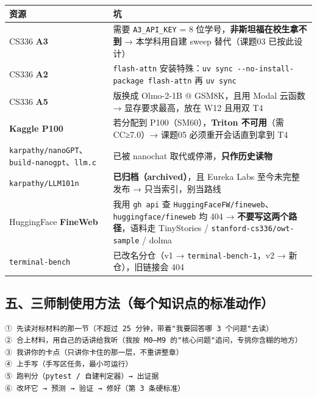 \documentclass[
  chinese,
  11pt,
]{ctexart}
\newcounter{none} %
\begin{document}
{\def\LTcaptype{none} %
\begin{longtable}[]{@{}
  >{\raggedright\arraybackslash}p{}
  >{\raggedright\arraybackslash}p{}@{}}
\toprule\noalign{}
\begin{minipage}[b]{\linewidth}\raggedright
资源
\end{minipage} & \begin{minipage}[b]{\linewidth}\raggedright
坑
\end{minipage} \\
\midrule\noalign{}
\endhead
\bottomrule\noalign{}
\endlastfoot
CS336 \textbf{A3} & 需要 \texttt{A3\_API\_KEY} = 8 位学号，\textbf{非斯坦福在校生拿不到} → 本学科用自建 sweep 替代（课题03 已按此设计） \\
CS336 \textbf{A2} & \texttt{flash-attn} 安装特殊：\texttt{uv\ sync\ -\/-no-install-package\ flash-attn} 再 \texttt{uv\ sync} \\
CS336 \textbf{A5} & 2026 版换成 Olmo-2-1B @ GSM8K，且用 Modal 云函数 → 显存要求最高，放在 W12 且用双 T4 \\
\textbf{Kaggle P100} & 若分配到 P100（SM60），\textbf{Triton 不可用}（需 CC≥7.0）→ 课题05 必须重开会话直到拿到 T4 \\
\texttt{karpathy/nanoGPT}、\texttt{build-nanogpt}、\texttt{llm.c} & 已被 nanochat 取代或停滞，\textbf{只作历史读物} \\
\texttt{karpathy/LLM101n} & \textbf{已归档（archived）}，且 Eureka Labs 至今未完整发布 → 只当索引，别当路线 \\
HuggingFace \textbf{FineWeb} & 我用 \texttt{gh\ api} 查 \texttt{HuggingFaceFW/fineweb}、\texttt{huggingface/fineweb} 均 404 → \textbf{不要写这两个路径}，语料走 TinyStories / \texttt{stanford-cs336/owt-sample} / dolma \\
\texttt{terminal-bench} & 已改名分仓（v1 → \texttt{terminal-bench-1}，v2 → 新仓），旧链接会 404 \\
\end{longtable}
}

\subsection{五、三师制使用方法（每个知识点的标准动作）}\label{ux4e94ux4e09ux5e08ux5236ux4f7fux7528ux65b9ux6cd5ux6bcfux4e2aux77e5ux8bc6ux70b9ux7684ux6807ux51c6ux52a8ux4f5c}

\begin{verbatim}
① 先读对标材料的那一节（不超过 25 分钟，带着"我要回答哪 3 个问题"去读）
② 合上材料，用自己的话讲给我听（我按 M0–M9 的"核心问题"追问，专挑你含糊的地方）
③ 我讲你的卡点（只讲你卡住的那一层，不重讲整章）
④ 上手写（手写区任务，最小可运行）
⑤ 跑判分（pytest / 自建判定器）→ 出证据
⑥ 改坏它 → 预测 → 验证 → 修好（第 3 条硬标准）
\end{verbatim}
\end{document}
